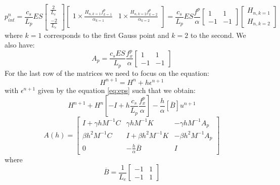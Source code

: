 \begin{equation}
    p_{int}^n = \frac{c_s}{L_p} E S \begin{bmatrix} \frac{2}{L_e} \\ \frac{-2}{L_e} \end{bmatrix} \begin{bmatrix} 1 \times \frac{H_{n,k=1} f^p_{k=1}}{\alpha_{k=1}}&  1 \times \frac{H_{n,k=2} f^p_{k=2}}{\alpha_{k=2}}  \\ \end{bmatrix} = \frac{c_s}{L_p} E S \frac{f^p}{\alpha} \begin{bmatrix}
        1 &1\\
        -1 & -1
    \end{bmatrix} \begin{bmatrix}H_{n,k=1} \\ H_{n,k=2}\end{bmatrix}
\end{equation} 
where $k=1$ corresponds to the first Gauss point and $k=2$ to the second. We also have:
\begin{equation}
    A_p = \frac{c_s E S}{L_p}\frac{f^p_x}{\alpha} \begin{bmatrix}
        1 &1\\
        -1 & -1
    \end{bmatrix}
\end{equation}
For the last row of the matrices we need to focus on the equation:
\begin{equation}
    H^{n+1} = H^n + h \epsilon^{n+1}
\end{equation}
with $\epsilon^{n+1}$ given by the equation \ref{eq:eps} such that we obtain:
\begin{equation}
    H^{n+1}+H^n\left[-I + h \frac{c_s}{L_p} \frac{f^p_x}{\alpha} \right] - \frac{h}{\alpha} \left[\overline{B} \right]u^{n+1} 
\end{equation}
\begin{equation}
    A(h) = \begin{bmatrix} I+\gamma h M^{-1} C & \gamma h M^{-1} K & -\gamma h M^{-1} A_p \\
    \beta h^2 M^{-1} C & I+\beta h^2 M^{-1} K & -\beta h^2 M^{-1} A_p\\
    0 & -\frac{h}{\alpha} \overline{B} & I
    \end{bmatrix}
    \label{eq:A(h)}
\end{equation}
where 
\begin{equation}
    \overline{B} = \frac{1}{L_e} \begin{bmatrix}
        -1 & 1\\
        -1 & 1
    \end{bmatrix}
\end{equation}
